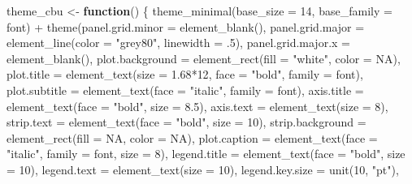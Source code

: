 \documentclass[
  letterpaper,
  DIV=11,
  numbers=noendperiod]{scrreprt}
\newenvironment{Shaded}{\begin{snugshade}}{\end{snugshade}}
\newcommand{\AttributeTok}[1]{\textcolor[rgb]{0.40,0.45,0.13}{#1}}
\newcommand{\ConstantTok}[1]{\textcolor[rgb]{0.56,0.35,0.01}{#1}}
\newcommand{\ControlFlowTok}[1]{\textcolor[rgb]{0.00,0.23,0.31}{\textbf{#1}}}
\newcommand{\DecValTok}[1]{\textcolor[rgb]{0.68,0.00,0.00}{#1}}
\newcommand{\FloatTok}[1]{\textcolor[rgb]{0.68,0.00,0.00}{#1}}
\newcommand{\FunctionTok}[1]{\textcolor[rgb]{0.28,0.35,0.67}{#1}}
\newcommand{\NormalTok}[1]{\textcolor[rgb]{0.00,0.23,0.31}{#1}}
\newcommand{\OtherTok}[1]{\textcolor[rgb]{0.00,0.23,0.31}{#1}}
\newcommand{\SpecialCharTok}[1]{\textcolor[rgb]{0.37,0.37,0.37}{#1}}
\newcommand{\StringTok}[1]{\textcolor[rgb]{0.13,0.47,0.30}{#1}}
\begin{document}
\begin{Shaded}
\begin{Highlighting}[]
\NormalTok{theme\_cbu }\OtherTok{\textless{}{-}} \ControlFlowTok{function}\NormalTok{() \{}
  \FunctionTok{theme\_minimal}\NormalTok{(}\AttributeTok{base\_size =} \DecValTok{14}\NormalTok{, }\AttributeTok{base\_family =}\NormalTok{ font) }\SpecialCharTok{+}
    \FunctionTok{theme}\NormalTok{(}\AttributeTok{panel.grid.minor =} \FunctionTok{element\_blank}\NormalTok{(),}
          \AttributeTok{panel.grid.major =} \FunctionTok{element\_line}\NormalTok{(}\AttributeTok{color =} \StringTok{"grey80"}\NormalTok{, }\AttributeTok{linewidth =}\NormalTok{ .}\DecValTok{5}\NormalTok{),}
          \AttributeTok{panel.grid.major.x =} \FunctionTok{element\_blank}\NormalTok{(),}
          \AttributeTok{plot.background =} \FunctionTok{element\_rect}\NormalTok{(}\AttributeTok{fill =} \StringTok{"white"}\NormalTok{, }\AttributeTok{color =} \ConstantTok{NA}\NormalTok{),}
          \AttributeTok{plot.title =} \FunctionTok{element\_text}\NormalTok{(}\AttributeTok{size =} \FloatTok{1.68}\SpecialCharTok{*}\DecValTok{12}\NormalTok{, }\AttributeTok{face =} \StringTok{"bold"}\NormalTok{, }\AttributeTok{family =}\NormalTok{ font),}
          \AttributeTok{plot.subtitle =} \FunctionTok{element\_text}\NormalTok{(}\AttributeTok{face =} \StringTok{"italic"}\NormalTok{, }\AttributeTok{family =}\NormalTok{ font),}
          \AttributeTok{axis.title =} \FunctionTok{element\_text}\NormalTok{(}\AttributeTok{face =} \StringTok{"bold"}\NormalTok{, }\AttributeTok{size =} \FloatTok{8.5}\NormalTok{),}
          \AttributeTok{axis.text =} \FunctionTok{element\_text}\NormalTok{(}\AttributeTok{size =} \DecValTok{8}\NormalTok{),}
          \AttributeTok{strip.text =} \FunctionTok{element\_text}\NormalTok{(}\AttributeTok{face =} \StringTok{"bold"}\NormalTok{, }\AttributeTok{size =} \DecValTok{10}\NormalTok{),}
          \AttributeTok{strip.background =} \FunctionTok{element\_rect}\NormalTok{(}\AttributeTok{fill =} \ConstantTok{NA}\NormalTok{, }\AttributeTok{color =} \ConstantTok{NA}\NormalTok{),}
          \AttributeTok{plot.caption =} \FunctionTok{element\_text}\NormalTok{(}\AttributeTok{face =} \StringTok{"italic"}\NormalTok{, }\AttributeTok{family =}\NormalTok{ font, }\AttributeTok{size =} \DecValTok{8}\NormalTok{),}
          \AttributeTok{legend.title =} \FunctionTok{element\_text}\NormalTok{(}\AttributeTok{face =} \StringTok{"bold"}\NormalTok{, }\AttributeTok{size =} \DecValTok{10}\NormalTok{),}
          \AttributeTok{legend.text =} \FunctionTok{element\_text}\NormalTok{(}\AttributeTok{size =} \DecValTok{10}\NormalTok{),}
          \AttributeTok{legend.key.size =} \FunctionTok{unit}\NormalTok{(}\DecValTok{10}\NormalTok{, }\StringTok{"pt"}\NormalTok{),}

\end{Highlighting}
\end{Shaded}
\end{document}
